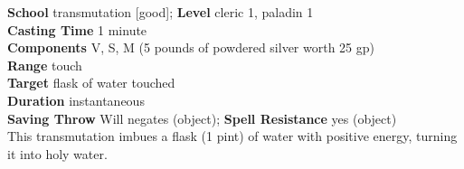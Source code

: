 \textbf{School} transmutation [good]; \textbf{Level} cleric 1, paladin 1\\
\textbf{Casting Time} 1 minute\\
\textbf{Components} V, S, M (5 pounds of powdered silver worth 25 gp)\\
\textbf{Range} touch\\
\textbf{Target} flask of water touched\\
\textbf{Duration} instantaneous\\
\textbf{Saving Throw }Will negates (object); \textbf{Spell Resistance} yes (object)\\
This transmutation imbues a flask (1 pint) of water with positive energy, turning it into holy water.\\
